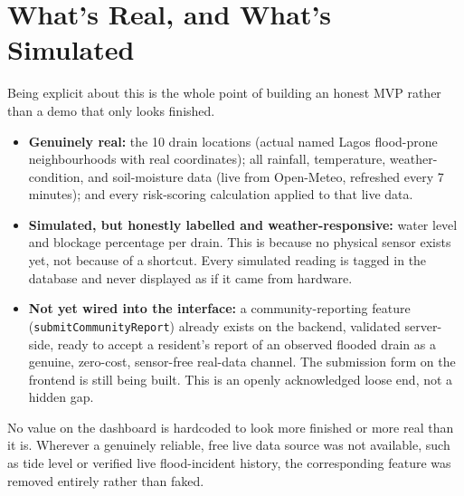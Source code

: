 \documentclass[11pt]{article}
\begin{document}
\section{What's Real, and What's Simulated}
Being explicit about this is the whole point of building an honest MVP rather than a demo that only looks finished.
\begin{itemize}
  \item \textbf{Genuinely real:} the 10 drain locations (actual named Lagos flood-prone neighbourhoods with real coordinates); all rainfall, temperature, weather-condition, and soil-moisture data (live from Open-Meteo, refreshed every 7 minutes); and every risk-scoring calculation applied to that live data.
  \item \textbf{Simulated, but honestly labelled and weather-responsive:} water level and blockage percentage per drain. This is because no physical sensor exists yet, not because of a shortcut. Every simulated reading is tagged in the database and never displayed as if it came from hardware.
  \item \textbf{Not yet wired into the interface:} a community-reporting feature (\texttt{submitCommunityReport}) already exists on the backend, validated server-side, ready to accept a resident's report of an observed flooded drain as a genuine, zero-cost, sensor-free real-data channel. The submission form on the frontend is still being built. This is an openly acknowledged loose end, not a hidden gap.
\end{itemize}
No value on the dashboard is hardcoded to look more finished or more real than it is. Wherever a genuinely reliable, free live data source was not available, such as tide level or verified live flood-incident history, the corresponding feature was removed entirely rather than faked.
\end{document}
